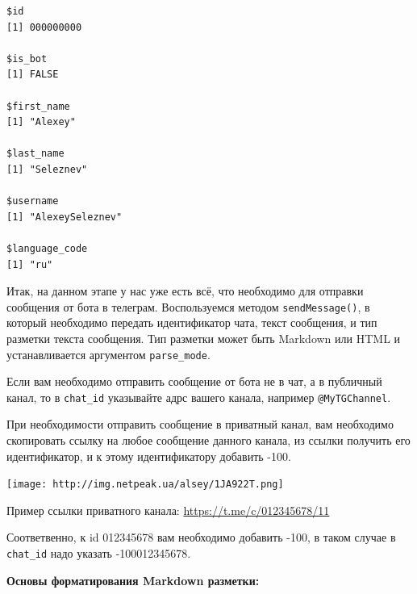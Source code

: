 \documentclass[
]{book}
\newenvironment{Shaded}{\begin{snugshade}}{\end{snugshade}}
\newcommand{\AttributeTok}[1]{\textcolor[rgb]{0.13,0.29,0.53}{#1}}
\newcommand{\CommentTok}[1]{\textcolor[rgb]{0.56,0.35,0.01}{\textit{#1}}}
\newcommand{\FunctionTok}[1]{\textcolor[rgb]{0.13,0.29,0.53}{\textbf{#1}}}
\newcommand{\NormalTok}[1]{#1}
\newcommand{\SpecialCharTok}[1]{\textcolor[rgb]{0.81,0.36,0.00}{\textbf{#1}}}
\newcommand{\StringTok}[1]{\textcolor[rgb]{0.31,0.60,0.02}{#1}}
\begin{document}
\begin{verbatim}
$id
[1] 000000000

$is_bot
[1] FALSE

$first_name
[1] "Alexey"

$last_name
[1] "Seleznev"

$username
[1] "AlexeySeleznev"

$language_code
[1] "ru"
\end{verbatim}

Итак, на данном этапе у нас уже есть всё, что необходимо для отправки сообщения от бота в телеграм. Воспользуемся методом \texttt{sendMessage()}, в который необходимо передать идентификатор чата, текст сообщения, и тип разметки текста сообщения. Тип разметки может быть Markdown или HTML и устанавливается аргументом \texttt{parse\_mode}.

\begin{Shaded}
\end{Shaded}

Если вам необходимо отправить сообщение от бота не в чат, а в публичный канал, то в \texttt{chat\_id} указывайте адрс вашего канала, например \texttt{\textquotesingle{}@MyTGChannel\textquotesingle{}}.

При необходимости отправить сообщение в приватный канал, вам необходимо скопировать ссылку на любое сообщение данного канала, из ссылки получить его идентификатор, и к этому идентификатору добавить -100.

\texttt{[image: http://img.netpeak.ua/alsey/1JA922T.png]}

Пример ссылки приватного канала: \url{https://t.me/c/012345678/11}

Соответвенно, к id 012345678 вам необходимо добавить -100, в таком случае в \texttt{chat\_id} надо указать -100012345678.

\textbf{Основы форматирования Markdown разметки:}
\end{document}
